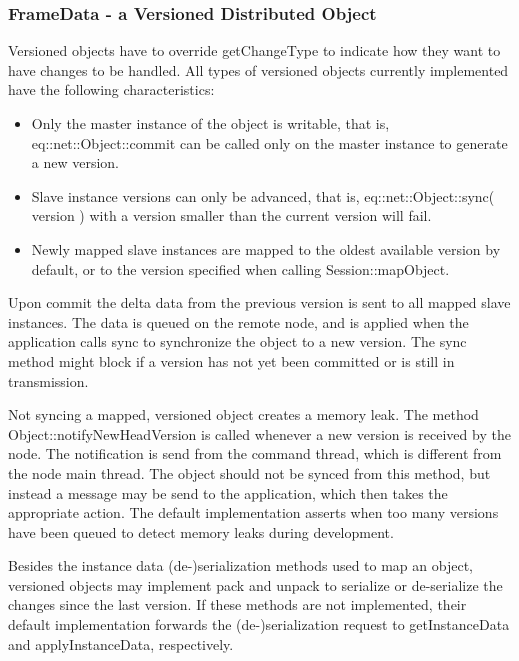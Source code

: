 \documentclass[10pt,a4]{scrartcl}
\begin{document}
\subsubsection{FrameData - a Versioned Distributed Object}

Versioned objects have to override \textsf{getChangeType} to indicate
how they want to have changes to be handled. All types of versioned
objects currently implemented have the following characteristics:

\begin{itemize}
\item Only the master instance of the object is writable, that is,
  \textsf{eq::net::Object::com\-mit} can be called only on the master
  instance to generate a new version.
\item Slave instance versions can only be advanced, that is,
  \textsf{eq::net::Object::sync( version )} with a version smaller than
  the current version will fail.
\item Newly mapped slave instances are mapped to the oldest available
  version by default, or to the version specified when calling
  \textsf{Session::mapObject}.
\end{itemize}

Upon \textsf{commit} the delta data from the previous version is sent to
all mapped slave instances. The data is queued on the remote node, and
is applied when the application calls \textsf{sync} to synchronize the
object to a new version. The \textsf{sync} method might block if a
version has not yet been committed or is still in transmission.

Not syncing a mapped, versioned object creates a memory leak. The method
\textsf{Object::notifyNewHeadVersion} is called whenever a new version
is received by the node. The notification is send from the command
thread, which is different from the node main thread. The object should
not be synced from this method, but instead a message may be send to the
application, which then takes the appropriate action. The default
implementation asserts when too many versions have been queued
to detect memory leaks during development.

Besides the instance data (de-)serialization methods used to map an
object, versioned objects may implement \textsf{pack} and
\textsf{unpack} to serialize or de-serialize the changes since the last
version. If these methods are not implemented, their default
implementation forwards the (de-)serialization request to
\textsf{getInstanceData} and \textsf{applyInstanceData}, respectively.
\end{document}
